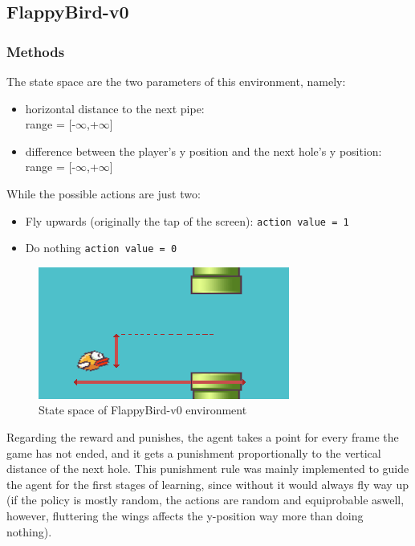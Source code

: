 \documentclass[11pt,a4paper,twocolumn]{IEEEtran}
\begin{document}
		\subsection{\textbf{FlappyBird-v0}}
			\subsubsection{\textbf{Methods}}
			The state space are the two parameters of this environment, namely:
			\begin{itemize}
				\item horizontal distance to the next pipe:\\ range = [-$\infty$,+$\infty$]
				\item difference between the player's y position and the next hole's y position:\\ range = [-$\infty$,+$\infty$]
			\end{itemize}
			While the possible actions are just two:
			\begin{itemize}
				\item Fly upwards (originally the tap of the screen): \texttt{action value = 1}
				\item Do nothing \texttt{action value = 0}
			\end{itemize}
		
			\begin{figure}[h]
				\centering
				\includegraphics[width=0.75\linewidth]{../imgs/github1}
				\caption{State space of FlappyBird-v0 environment}
			\end{figure}
			Regarding the reward and punishes, the agent takes a point for every frame the game has not ended, and it gets a punishment proportionally to the vertical distance of the next hole. This punishment rule was mainly implemented to guide the agent for the first stages of learning, since without it would always fly way up (if the policy is mostly random, the actions are random and equiprobable aswell, however, fluttering the wings affects the y-position way more than doing nothing).\medskip\\
		
\end{document}
